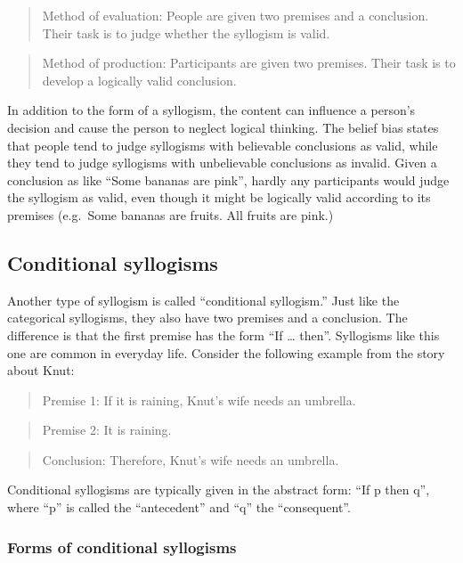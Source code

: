 \documentclass[
]{krantz}
\begin{document}
\begin{quote}
Method of evaluation: People are given two premises and a conclusion. Their task is to judge whether the syllogism is valid.
\end{quote}

\begin{quote}
Method of production: Participants are given two premises. Their task is to develop a logically valid conclusion.
\end{quote}

In addition to the form of a syllogism, the content can influence a person's decision and cause the person to neglect logical thinking. The belief bias states that people tend to judge syllogisms with believable conclusions as valid, while they tend to judge syllogisms with unbelievable conclusions as invalid. Given a conclusion as like ``Some bananas are pink'', hardly any participants would judge the syllogism as valid, even though it might be logically valid according to its premises (e.g.~Some bananas are fruits. All fruits are pink.)

\hypertarget{conditional-syllogisms}{%
\subsection*{Conditional syllogisms}\label{conditional-syllogisms}}


Another type of syllogism is called ``conditional syllogism.'' Just like the categorical syllogisms, they also have two premises and a conclusion. The difference is that the first premise has the form ``If \ldots{} then''. Syllogisms like this one are common in everyday life. Consider the following example from the story about Knut:

\begin{quote}
Premise 1: If it is raining, Knut's wife needs an umbrella.
\end{quote}

\begin{quote}
Premise 2: It is raining.
\end{quote}

\begin{quote}
Conclusion: Therefore, Knut's wife needs an umbrella.
\end{quote}

Conditional syllogisms are typically given in the abstract form: ``If p then q'', where ``p'' is called the ``antecedent'' and ``q'' the ``consequent''.

\hypertarget{forms-of-conditional-syllogisms}{%
\subsubsection*{Forms of conditional syllogisms}\label{forms-of-conditional-syllogisms}}
\end{document}
